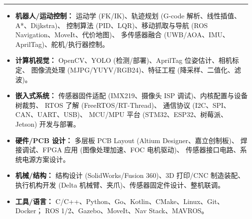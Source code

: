 \documentclass{common/resume}
\newcommand{\sectionBar}[1]{%
  \vspace{0.24em}%
  \noindent\colorbox{ResumeBlue}{\makebox[2.30cm][l]{\strut\hspace{0.32em}\textcolor{white}{\bfseries\small #1}}}%
  \hspace{0.12em}\textcolor{LineGray}{\rule[0.45ex]{0.74\linewidth}{0.45pt}}%
  \vspace{0.06em}\par
}
\begin{document}
\sectionBar{技术栈}
\begin{itemize}
  \item \textbf{机器人/运动控制：} 运动学 (FK/IK)、轨迹规划 (G-code 解析、线性插值、A*、Dijkstra)、
        控制算法 (PID、LQR)、移动抓取与导航 (ROS Navigation、MoveIt、代价地图)、
        多传感器融合 (UWB/AOA、IMU、AprilTag)、舵机/执行器控制。
  \item \textbf{计算机视觉：} OpenCV、YOLO (检测/部署)、AprilTag 位姿估计、相机标定、
        图像流处理 (MJPG/YUYV/RGB24)、特征工程 (降采样、二值化、滤波)。
  \item \textbf{嵌入式系统：} 传感器固件适配 (IMX219、摄像头 ISP 调试)、内核配置与设备树裁剪、
        RTOS 了解 (FreeRTOS/RT-Thread)、
        通信协议 (I2C、SPI、CAN、UART、USB)、
        MCU/MPU 平台 (STM32、ESP32、树莓派、Jetson) 开发与部署。
  \item \textbf{硬件/PCB 设计：} 多层板 PCB Layout (Altium Designer、嘉立创制板)、
        焊接调试、FPGA 应用 (图像处理加速、FOC 电机驱动)、
        传感器接口电路、系统电源方案设计。
  \item \textbf{机械/结构：} 结构设计 (SolidWorks/Fusion 360)、3D 打印/CNC 制造装配、
        执行机构开发 (Delta 机械臂、夹爪)、传感器固定件设计、整机联调。
  \item \textbf{工具/语言：} C/C++、Python、Go、Kotlin、CMake、Linux、Git、Docker；
        ROS 1/2、Gazebo、MoveIt、Nav Stack、MAVROS。
\end{itemize}
\end{document}
